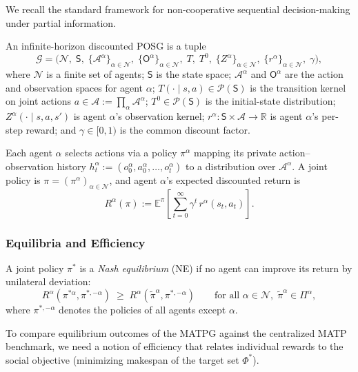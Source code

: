 We recall the standard framework for non-cooperative sequential decision-making under partial information. 

\begin{definition}
An infinite-horizon discounted POSG is a tuple
\[
\mathcal{G} = \Big(\mathcal{N},\;\mathsf{S},\;\{\mathcal{A}^\alpha\}_{\alpha\in\mathcal{N}},\;\{\mathsf{O}^\alpha\}_{\alpha\in\mathcal{N}},\;T,\;T^0,\;\{Z^\alpha\}_{\alpha\in\mathcal{N}},\;\{r^\alpha\}_{\alpha\in\mathcal{N}},\;\gamma\Big),
\]
where $\mathcal{N}$ is a finite set of agents; $\mathsf{S}$ is the state space; $\mathcal{A}^\alpha$ and $\mathsf{O}^\alpha$ are the action and observation spaces for agent $\alpha$; $T(\cdot\mid s,a)\in\mathcal{P}(\mathsf{S})$ is the transition kernel on joint actions $a\in\mathcal{A}:=\prod_\alpha\mathcal{A}^\alpha$; $T^0\in\mathcal{P}(\mathsf{S})$ is the initial-state distribution; $Z^\alpha(\cdot\mid s,a,s')$ is agent $\alpha$'s observation kernel; $r^\alpha:\mathsf{S}\times\mathcal{A}\to\mathbb{R}$ is agent $\alpha$'s per-step reward; and $\gamma\in[0,1)$ is the common discount factor.
\end{definition}

Each agent $\alpha$ selects actions via a policy $\pi^\alpha$ mapping its private action--observation history $h^\alpha_t := (o^\alpha_0,a^\alpha_0,\ldots,o^\alpha_t)$ to a distribution over $\mathcal{A}^\alpha$. A joint policy is $\pi = (\pi^\alpha)_{\alpha\in\mathcal{N}}$, and agent $\alpha$'s expected discounted return is
\[
R^\alpha(\pi) := \mathbb{E}^{\pi}\!\left[\sum_{t=0}^{\infty}\gamma^t\, r^\alpha(s_t,a_t)\right].
\]

\subsubsection{Equilibria and Efficiency}

\begin{definition}
A joint policy $\pi^*$ is a \emph{Nash equilibrium} (NE) if no agent can improve its return by unilateral deviation:
\[
R^\alpha(\pi^{*\alpha},\pi^{*,-\alpha}) \;\ge\; R^\alpha(\tilde\pi^\alpha,\pi^{*,-\alpha})
\qquad\text{for all }\alpha\in\mathcal{N},\; \tilde\pi^\alpha\in\Pi^\alpha,
\]
where $\pi^{*,-\alpha}$ denotes the policies of all agents except $\alpha$.
\end{definition}

To compare equilibrium outcomes of the MATPG against the centralized MATP benchmark, we need a notion of efficiency that relates individual rewards to the social objective (minimizing makespan of the target set $\Phi^*$).

